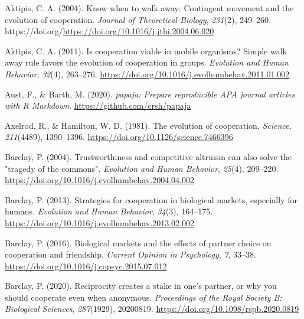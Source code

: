 \documentclass[
  man,floatsintext]{apa6}
\newlength{\cslhangindent}
\newlength{\cslentryspacingunit} %
\newenvironment{CSLReferences}[2] %
 {%
  \setlength{\parindent}{0pt}
  \ifodd #1
  \let\oldpar\par
  \def\par{\hangindent=\cslhangindent\oldpar}
  \fi
  \setlength{\parskip}{#2\cslentryspacingunit}
 }%
 {}
\begin{document}
\begingroup
\setlength{\parindent}{-0.5in}
\setlength{\leftskip}{0.5in}

\hypertarget{refs}{}
\begin{CSLReferences}{1}{0}
\leavevmode{}%
Aktipis, C. A. (2004). Know when to walk away: Contingent movement and the evolution of cooperation. \emph{Journal of Theoretical Biology}, \emph{231}(2), 249--260. https://doi.org/\url{https://doi.org/10.1016/j.jtbi.2004.06.020}

\leavevmode{}%
Aktipis, C. A. (2011). Is cooperation viable in mobile organisms? Simple walk away rule favors the evolution of cooperation in groups. \emph{Evolution and Human Behavior}, \emph{32}(4), 263--276. \url{https://doi.org/10.1016/j.evolhumbehav.2011.01.002}

\leavevmode{}%
Aust, F., \& Barth, M. (2020). \emph{{papaja}: {Prepare} reproducible {APA} journal articles with {R Markdown}}. \url{https://github.com/crsh/papaja}

\leavevmode{}%
Axelrod, R., \& Hamilton, W. D. (1981). The evolution of cooperation. \emph{Science}, \emph{211}(4489), 1390--1396. \url{https://doi.org/10.1126/science.7466396}

\leavevmode{}%
Barclay, P. (2004). Trustworthiness and competitive altruism can also solve the "tragedy of the commons". \emph{Evolution and Human Behavior}, \emph{25}(4), 209--220. \url{https://doi.org/10.1016/j.evolhumbehav.2004.04.002}

\leavevmode{}%
Barclay, P. (2013). Strategies for cooperation in biological markets, especially for humans. \emph{Evolution and Human Behavior}, \emph{34}(3), 164--175. \url{https://doi.org/10.1016/j.evolhumbehav.2013.02.002}

\leavevmode{}%
Barclay, P. (2016). Biological markets and the effects of partner choice on cooperation and friendship. \emph{Current Opinion in Psychology}, \emph{7}, 33--38. \url{https://doi.org/10.1016/j.copsyc.2015.07.012}

\leavevmode{}%
Barclay, P. (2020). Reciprocity creates a stake in one's partner, or why you should cooperate even when anonymous. \emph{Proceedings of the Royal Society B: Biological Sciences}, \emph{287}(1929), 20200819. \url{https://doi.org/10.1098/rspb.2020.0819}


\end{CSLReferences}
\end{document}
